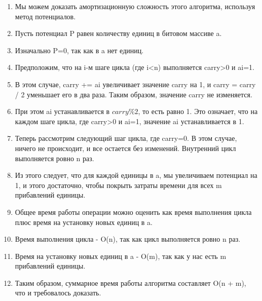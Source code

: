 

\begin{enumerate}

	\item Мы можем доказать амортизационную сложность этого алгоритма, используя метод потенциалов.

	\item Пусть потенциал P равен количеству единиц в битовом массиве a. 
	
	\item Изначально P=0, так как в a нет единиц.
	
	\item Предположим, что на i-м шаге цикла (где i<n) выполняется carry>0 и ai=1. 
	
	\item В этом случае, carry += ai увеличивает значение carry на 1, и carry = carry / 2 уменьшает его в два раза. Таким образом, значение carry не изменяется.
	
	\item При этом ai устанавливается в $carry \% 2$, то есть равно 1. Это означает, что на каждом шаге цикла, где carry>0 и ai=1, значение ai устанавливается в 1.
	
	\item Теперь рассмотрим следующий шаг цикла, где carry=0. В этом случае, ничего не происходит, и все остается без изменений. Внутренний цикл выполняется ровно n раз.
	
	\item Из этого следует, что для каждой единицы в a, мы увеличиваем потенциал на 1, и этого достаточно, чтобы покрыть затраты времени для всех m прибавлений единицы.
	
	\item Общее время работы операции можно оценить как время выполнения цикла плюс время на установку новых единиц в a.
	
	\item Время выполнения цикла - O(n), так как цикл выполняется ровно n раз.
	
	\item Время на установку новых единиц в a - O(m), так как у нас есть m прибавлений единицы.
	
	\item Таким образом, суммарное время работы алгоритма составляет O(n + m), что и требовалось доказать.
	
\end{enumerate}
